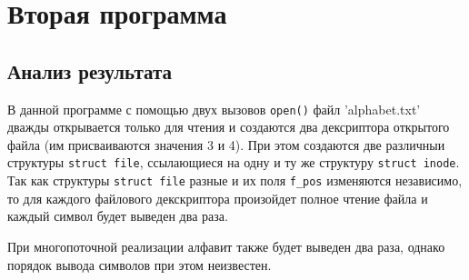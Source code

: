 \chapter{Вторая программа}

\vspace{-0.5cm}


\clearpage
{}


\vspace{-1cm}
\section*{Анализ результата}

В данной программе с помощью двух вызовов \texttt{open()} файл 'alphabet.txt'
дважды открывается только для чтения и создаются два дексриптора открытого
файла (им присваиваются значения 3 и 4). При этом создаются две различныи
структуры \texttt{struct file}, ссылающиеся на одну и ту же структуру
\texttt{struct inode}. Так как структуры \texttt{struct file} разные и их поля
\texttt{f\_pos} изменяются независимо, то для каждого файлового декскриптора
произойдет полное чтение файла и каждый символ будет выведен два
раза.

При многопоточной реализации алфавит также будет выведен два раза, однако
порядок вывода символов при этом неизвестен.

